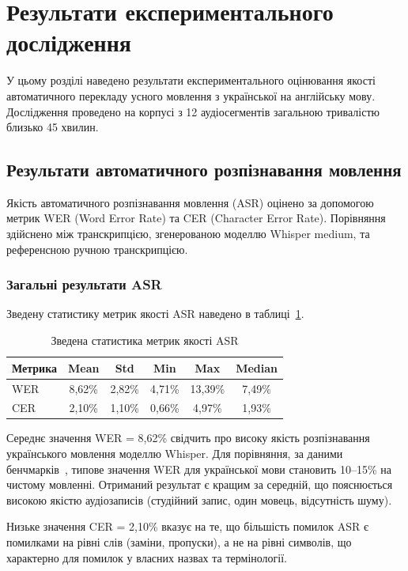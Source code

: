 \section{Результати експериментального дослідження}
\label{sec:results}

У цьому розділі наведено результати експериментального оцінювання якості
автоматичного перекладу усного мовлення з української на англійську мову.
Дослідження проведено на корпусі з 12 аудіосегментів загальною тривалістю
близько 45 хвилин.

\subsection{Результати автоматичного розпізнавання мовлення}

Якість автоматичного розпізнавання мовлення (ASR) оцінено за допомогою
метрик WER (Word Error Rate) та CER (Character Error Rate). Порівняння
здійснено між транскрипцією, згенерованою моделлю Whisper medium, та
референсною ручною транскрипцією.

\subsubsection{Загальні результати ASR}

Зведену статистику метрик якості ASR наведено в таблиці~\ref{tab:asr_summary}.

\begin{table}[H]
\centering
\caption{Зведена статистика метрик якості ASR}
\label{tab:asr_summary}
\begin{tabular}{|l|c|c|c|c|c|}
\hline
\textbf{Метрика} & \textbf{Mean} & \textbf{Std} & \textbf{Min} & \textbf{Max} & \textbf{Median} \\
\hline
WER & 8,62\% & 2,82\% & 4,71\% & 13,39\% & 7,49\% \\
CER & 2,10\% & 1,10\% & 0,66\% & 4,97\% & 1,93\% \\
\hline
\end{tabular}
\end{table}

Середнє значення WER = 8,62\% свідчить про високу якість розпізнавання
українського мовлення моделлю Whisper. Для порівняння, за даними
бенчмарків~\cite{whisper}, типове значення WER для української мови
становить 10--15\% на чистому мовленні. Отриманий результат є кращим
за середній, що пояснюється високою якістю аудіозаписів (студійний запис,
один мовець, відсутність шуму).

Низьке значення CER = 2,10\% вказує на те, що більшість помилок ASR
є помилками на рівні слів (заміни, пропуски), а не на рівні символів,
що характерно для помилок у власних назвах та термінології.


